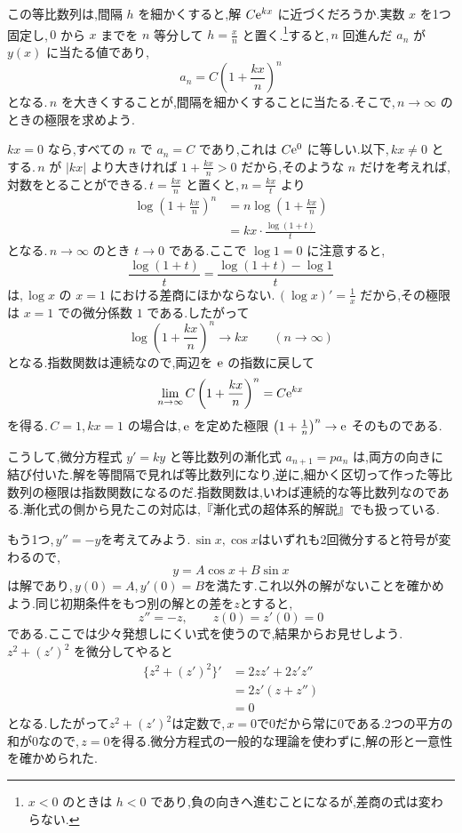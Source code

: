 この等比数列は,間隔 $h$ を細かくすると,解 $C\mathrm{e}^{kx}$ に近づくだろうか.実数 $x$ を1つ固定し,\,$0$ から $x$ までを $n$ 等分して $h=\frac xn$ と置く.\footnote{$x<0$ のときは $h<0$ であり,負の向きへ進むことになるが,差商の式は変わらない.}すると,\,$n$ 回進んだ $a_n$ が $y(x)$ に当たる値であり,
\[
 a_n=C\left(1+\frac{kx}{n}\right)^n
\]
となる.\,$n$ を大きくすることが,間隔を細かくすることに当たる.そこで,\,$n\to\infty$ のときの極限を求めよう.

$kx=0$ なら,すべての $n$ で $a_n=C$ であり,これは $C\mathrm{e}^0$ に等しい.以下,\,$kx\ne0$ とする.\,$n$ が $|kx|$ より大きければ $1+\frac{kx}{n}>0$ だから,そのような $n$ だけを考えれば,対数をとることができる.\,$t=\frac{kx}{n}$ と置くと,\,$n=\frac{kx}{t}$ より
\begin{align*}
 \log\left(1+\frac{kx}{n}\right)^n
 &=n\log\left(1+\frac{kx}{n}\right)\\
 &=kx\cdot\frac{\log(1+t)}{t}
\end{align*}
となる.\,$n\to\infty$ のとき $t\to0$ である.ここで $\log1=0$ に注意すると,
\[
 \frac{\log(1+t)}{t}=\frac{\log(1+t)-\log1}{t}
\]
は,\,$\log x$ の $x=1$ における差商にほかならない.\,$(\log x)'=\frac1x$ だから,その極限は $x=1$ での微分係数 $1$ である.したがって
\[
 \log\left(1+\frac{kx}{n}\right)^n\longrightarrow kx\qquad(n\to\infty)
\]
となる.指数関数は連続なので,両辺を $\mathrm{e}$ の指数に戻して
\[
 \lim_{n\to\infty}C\left(1+\frac{kx}{n}\right)^n=C\mathrm{e}^{kx}
\]
を得る.\,$C=1$,\,$kx=1$ の場合は,\,$\mathrm{e}$ を定めた極限 $\left(1+\frac1n\right)^n\to\mathrm{e}$ そのものである.

こうして,微分方程式 $y'=ky$ と等比数列の漸化式 $a_{n+1}=pa_n$ は,両方の向きに結び付いた.解を等間隔で見れば等比数列になり,逆に,細かく区切って作った等比数列の極限は指数関数になるのだ.指数関数は,いわば連続的な等比数列なのである.漸化式の側から見たこの対応は,『漸化式の超体系的解説』でも扱っている.

もう1つ,\,$y''=-y$を考えてみよう.\,$\sin x,\cos x$はいずれも2回微分すると符号が変わるので,
\[
 y=A\cos x+B\sin x
\]
は解であり,\,$y(0)=A$,\,$y'(0)=B$を満たす.これ以外の解がないことを確かめよう.同じ初期条件をもつ別の解との差を$z$とすると,
\[
 z''=-z,\qquad z(0)=z'(0)=0
\]
である.ここでは少々発想しにくい式を使うので,結果からお見せしよう.\,$z^2+(z')^2$ を微分してやると
\begin{align*}
 \{z^2+(z')^2\}'
 &=2zz'+2z'z''\\
 &=2z'(z+z'')\\
 &=0
\end{align*}
となる.したがって$z^2+(z')^2$は定数で,\,$x=0$で$0$だから常に$0$である.2つの平方の和が$0$なので,\,$z=0$を得る.微分方程式の一般的な理論を使わずに,解の形と一意性を確かめられた.

